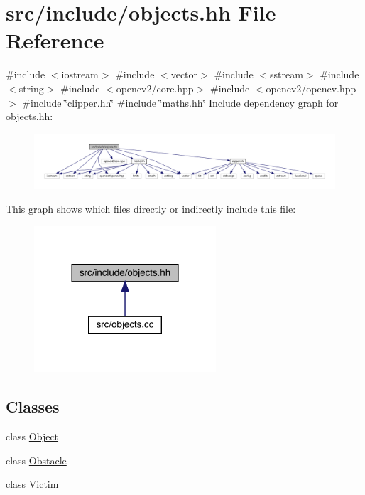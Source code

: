\hypertarget{objects_8hh}{}\section{src/include/objects.hh File Reference}
\label{objects_8hh}
{\ttfamily \#include $<$iostream$>$}\newline
{\ttfamily \#include $<$vector$>$}\newline
{\ttfamily \#include $<$sstream$>$}\newline
{\ttfamily \#include $<$string$>$}\newline
{\ttfamily \#include $<$opencv2/core.\+hpp$>$}\newline
{\ttfamily \#include $<$opencv2/opencv.\+hpp$>$}\newline
{\ttfamily \#include \char`\"{}clipper.\+hh\char`\"{}}\newline
{\ttfamily \#include \char`\"{}maths.\+hh\char`\"{}}\newline
Include dependency graph for objects.\+hh\+:
\nopagebreak
\begin{figure}[H]
\begin{center}
\leavevmode
\includegraphics[width=350pt]{objects_8hh__incl}
\end{center}
\end{figure}
This graph shows which files directly or indirectly include this file\+:
\nopagebreak
\begin{figure}[H]
\begin{center}
\leavevmode
\includegraphics[width=192pt]{objects_8hh__dep__incl}
\end{center}
\end{figure}
\subsection*{Classes}
\begin{DoxyCompactItemize}
\item 
class \mbox{\hyperlink{class_object}{Object}}
\item 
class \mbox{\hyperlink{class_obstacle}{Obstacle}}
\item 
class \mbox{\hyperlink{class_victim}{Victim}}
\end{DoxyCompactItemize}
